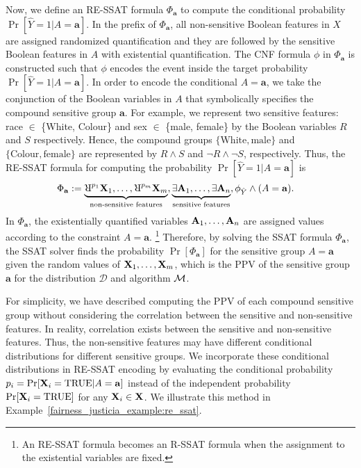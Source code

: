Now, we define an RE-SSAT formula $\Phi_{\mathbf{a}}$ to compute the conditional probability $\Pr[\hat{Y} = 1 | A = \mathbf{a}]$. In the prefix of $ \Phi_{\mathbf{a}} $,  all non-sensitive Boolean features in $X$ are assigned randomized quantification and they are followed by the sensitive Boolean features in $ A $ with existential quantification. The CNF formula $ \phi $ in $ \Phi_{\mathbf{a}} $ is constructed such that $ \phi $ encodes the event inside the target probability $ \Pr[\hat{Y} = 1 | A = \mathbf{a}] $. In order to encode the conditional $ A = \mathbf{a} $, we take the conjunction of the Boolean variables in $ A $ that symbolically specifies the compound sensitive group $ \mathbf{a} $. For example, we represent two sensitive features: race $ \in $ \{White, Colour\} and sex $ \in $ \{male, female\} by the Boolean variables $ R $ and $ S $  respectively. Hence, the compound groups $\{\textrm{White}, \textrm{male}\}$ and $\{\textrm{Colour}, \textrm{female}\}$ are represented by $ R \wedge S $ and $ \neg R \wedge \neg S $, respectively. Thus, the RE-SSAT formula for computing the probability  $ \Pr[\hat{Y} = 1 | A = \mathbf{a}] $ is
\begin{equation}	\label{fairness_justicia_eq:re}
\begin{split}
	\Phi_{\mathbf{a}} := \underbrace{\R^{p_{1}}\nonsensitive_1, \dots, \R^{p_{m}}\nonsensitive_m}_{\text{non-sensitive features}},  &\underbrace{\exists \sensitive_1,\dots, \exists \sensitive_n}_{\text{sensitive features}},
\phi_{\hat{Y}} \wedge (A=\mathbf{a}).\notag
\end{split}
\end{equation}
In $ \Phi_{\mathbf{a}} $, the existentially quantified variables $ \mathbf{A}_1, \dots, \mathbf{A}_n $ are assigned values  according  to the constraint $ A=\mathbf{a} $. \footnote{An RE-SSAT formula becomes an R-SSAT formula when the assignment to the existential variables are fixed.} Therefore, by solving the SSAT formula $ \Phi_{\mathbf{a}} $,  the SSAT solver finds the probability $ \Pr[\Phi_{\mathbf{a}}] $ for the sensitive group $ A=\mathbf{a} $ given the random values of $ \mathbf{X}_1, \dots, \mathbf{X}_m $, which is the PPV of the sensitive group $\mathbf{a} $ for the distribution $ \mathcal{D} $ and algorithm $\mathcal{M}$. 

For simplicity, we have described computing the PPV of each compound sensitive group without considering the correlation between the sensitive and non-sensitive features. In reality, correlation exists between the sensitive and non-sensitive features. Thus, the non-sensitive features may have different conditional distributions for different sensitive groups. We incorporate these conditional distributions in RE-SSAT encoding by evaluating the conditional probability $ p_i = \Pr[\mathbf{X}_i =\text{TRUE}| A=\mathbf{a}] $ instead of the independent probability $\Pr[\mathbf{X}_i =\text{TRUE}]$ for any $\mathbf{X}_i\in \mathbf{X}$. We illustrate this method in Example~\ref{fairness_justicia_example:re_ssat}.

